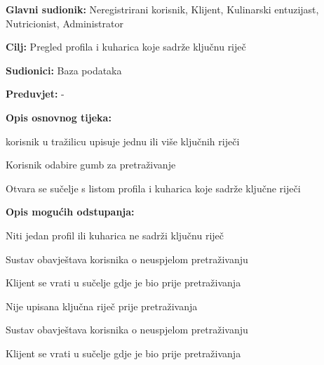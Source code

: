 					\noindent {}
					\begin{packed_item}
	
						\item \textbf{Glavni sudionik: }Neregistrirani korisnik, Klijent, Kulinarski entuzijast, Nutricionist, Administrator
						\item  \textbf{Cilj:} Pregled profila i kuharica koje sadrže ključnu riječ
						\item  \textbf{Sudionici:} Baza podataka
						\item  \textbf{Preduvjet:} -
						\item  \textbf{Opis osnovnog tijeka:} 
						
						\item[] \begin{packed_enum}
	
							\item korisnik u tražilicu upisuje jednu ili više ključnih riječi 
							\item Korisnik odabire gumb za pretraživanje
							\item Otvara se sučelje s listom profila i kuharica koje sadrže ključne riječi
						\end{packed_enum}
						
						\item  \textbf{Opis mogućih odstupanja:}
						
						\item[] \begin{packed_item}
	
							\item[2.a] Niti jedan profil ili kuharica ne sadrži ključnu riječ
							\item[] \begin{packed_enum}
								
								\item Sustav obavještava korisnika o neuspjelom pretraživanju 
								\item Klijent se vrati u sučelje gdje je bio prije pretraživanja
								
							\end{packed_enum}

							\item[2.b] Nije upisana ključna riječ prije pretraživanja
							\item[] \begin{packed_enum}
								
								\item Sustav obavještava korisnika o neuspjelom pretraživanju 
								\item Klijent se vrati u sučelje gdje je bio prije pretraživanja
								
							\end{packed_enum}							
						\end{packed_item}
					\end{packed_item}



